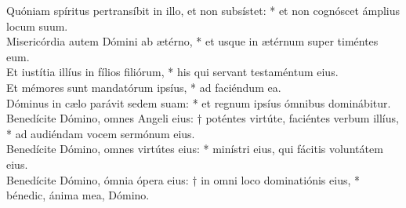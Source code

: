 {	Quóniam spíritus pertransíbit in illo, et non subsístet: * et non cognóscet ámplius locum suum. \\
	Misericórdia autem Dómini ab ætérno, * et usque in ætérnum super timéntes eum. \\
	Et iustítia illíus in fílios filiórum, * his qui servant testaméntum eius. \\
	Et mémores sunt mandatórum ipsíus, * ad faciéndum ea. \\
	Dóminus in cælo parávit sedem suam: * et regnum ipsíus ómnibus dominábitur. \\
	Benedícite Dómino, omnes Angeli eius: † poténtes virtúte, faciéntes verbum illíus, * ad audiéndam vocem sermónum eius. \\
	Benedícite Dómino, omnes virtútes eius: * minístri eius, qui fácitis voluntátem eius. \\
	Benedícite Dómino, ómnia ópera eius: † in omni loco dominatiónis eius, * bénedic, ánima mea, Dómino.
}

